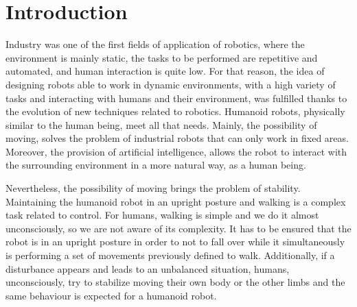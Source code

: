 \chapter{Introduction}
Industry was one of the first fields of application of robotics, where the environment is mainly static, the tasks to be performed are repetitive and automated, and human interaction is quite low. For that reason, the idea of designing robots able to work in dynamic environments, with a high variety of tasks and interacting with humans and their environment, was fulfilled thanks to the evolution of new techniques related to robotics. Humanoid robots, physically similar to the human being, meet all that needs. Mainly, the possibility of moving, solves the problem of industrial robots that can only work in fixed areas. Moreover, the provision of artificial intelligence, allows the robot to interact with the surrounding environment in a more natural way, as a human being.

Nevertheless, the possibility of moving brings the problem of stability. Maintaining the humanoid robot in an upright posture and walking is a complex task related to control. For humans, walking is simple and we do it almost unconsciously, so we are not aware of its complexity. It has to be ensured that the robot is in an upright posture in order to not to fall over while it simultaneously is performing a set of movements previously defined to walk. Additionally, if a disturbance appears and leads to an unbalanced situation, humans, unconsciously, try to stabilize moving their own body or the other limbs and the same behaviour is expected for a humanoid robot.

